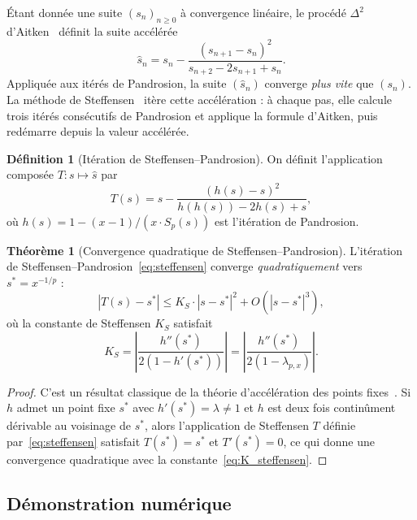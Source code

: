 \documentclass[11pt,a4paper]{article}
\theoremstyle{definition}
\newtheorem{definition}{Définition}[section]
\newtheorem{theorem}{Théorème}[section]
\begin{document}
Étant donnée une suite $(s_n)_{n \geq 0}$ à convergence linéaire, le procédé $\Delta^2$ d'Aitken~\cite{stoer} définit la suite accélérée
\[
  \hat{s}_n = s_n - \frac{(s_{n+1} - s_n)^2}{s_{n+2} - 2s_{n+1} + s_n}.
\]
Appliquée aux itérés de Pandrosion, la suite $(\hat{s}_n)$ converge \emph{plus vite} que $(s_n)$. La méthode de Steffensen~\cite{steffensen} itère cette accélération : à chaque pas, elle calcule trois itérés consécutifs de Pandrosion et applique la formule d'Aitken, puis redémarre depuis la valeur accélérée.

\begin{definition}[Itération de Steffensen--Pandrosion]
\label{def:steffensen}
On définit l'application composée $T : s \mapsto \hat{s}$ par
\begin{equation}
  \label{eq:steffensen}
  T(s) = s - \frac{(h(s) - s)^2}{h(h(s)) - 2h(s) + s},
\end{equation}
où $h(s) = 1 - (x-1)/(x \cdot S_p(s))$ est l'itération de Pandrosion.
\end{definition}

\begin{theorem}[Convergence quadratique de Steffensen--Pandrosion]
\label{thm:steffensen}
L'itération de Steffensen--Pandrosion~\eqref{eq:steffensen} converge \emph{quadratiquement} vers $s^* = x^{-1/p}$ :
\[
  |T(s) - s^*| \leq K_S \cdot |s - s^*|^2 + O(|s - s^*|^3),
\]
où la constante de Steffensen $K_S$ satisfait
\begin{equation}
  \label{eq:K_steffensen}
  K_S = \left|\frac{h''(s^*)}{2(1 - h'(s^*))}\right| = \left|\frac{h''(s^*)}{2(1 - \lambda_{p,x})}\right|.
\end{equation}
\end{theorem}

\begin{proof}
C'est un résultat classique de la théorie d'accélération des points fixes~\cite{stoer}. Si $h$ admet un point fixe $s^*$ avec $h'(s^*) = \lambda \neq 1$ et $h$ est deux fois continûment dérivable au voisinage de $s^*$, alors l'application de Steffensen $T$ définie par~\eqref{eq:steffensen} satisfait $T(s^*) = s^*$ et $T'(s^*) = 0$, ce qui donne une convergence quadratique avec la constante~\eqref{eq:K_steffensen}.
\end{proof}

\subsection{Démonstration numérique}
\end{document}
